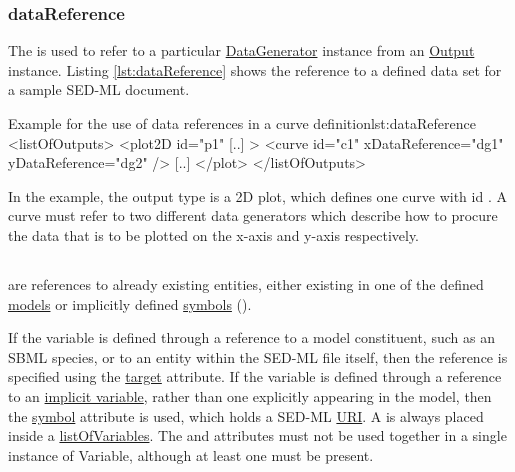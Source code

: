 \subsubsection{dataReference}
\label{sec:dataReference}
The  is used to refer to a particular \hyperref[class:dataGenerator]{DataGenerator} instance from an \hyperref[class:output]{Output} instance. Listing \ref{lst:dataReference} shows the reference to a defined data set for a sample SED-ML document. 

\begin{myXmlLst}{Example for the use of data references in a curve definition}{lst:dataReference}
<listOfOutputs>
	<plot2D id="p1" [..] >
    		<curve id="c1" xDataReference="dg1" yDataReference="dg2" />
		[..]
	</plot>
</listOfOutputs>
\end{myXmlLst}

In the example, the output type is a 2D plot, which defines one curve with id . A curve must refer to two different data generators which describe how to procure the data that is to be plotted on the x-axis and y-axis respectively. 


\subsection{}
\label{class:variable}
 are references to already existing entities, either existing in one of the defined \hyperref[class:model]{models} or implicitly defined \hyperref[sec:symbol]{symbols} (). 


If the variable is defined through a reference to a model constituent, such as an SBML species, or to an entity within the SED-ML file itself, then the reference is specified using the \hyperref[sec:target]{target} attribute.
If the variable is defined through a reference to an \hyperref[sec:implicitVariable]{implicit variable}, rather than one explicitly appearing in the model, then the \hyperref[sec:symbol]{symbol} attribute is used, which holds a SED-ML \hyperref[sec:uriScheme]{URI}.
A  is always placed inside a \hyperref[sec:listOfVariables]{listOfVariables}.
The  and  attributes must not be used together in a single instance of Variable, although at least one must be present.

